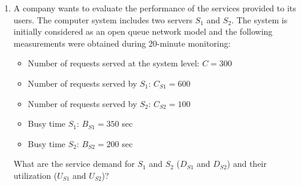 \begin{enumerate}
    
    \newpage


    \item A company wants to evaluate the performance of the services provided to its users. The computer system includes two servers $S_1$ and $S_2$. The system is initially considered as an open queue network model and the following measurements were obtained during 20-minute monitoring:
    \begin{itemize}
        \item Number of requests served at the system level: $C = 300$
        \item Number of requests served by $S_1$: $C_{S1} = 600$
        \item Number of requests served by $S_2$: $C_{S2} = 100$
        \item Busy time $S_1$: $B_{S1} = 350$ sec
        \item Busy time $S_2$: $B_{S2} = 200$ sec
    \end{itemize}
    What are the service demand for $S_{1}$ and $S_{2}$ ($D_{S1}$ and $D_{S2}$) and their utilization ($U_{S1}$ and $U_{S2}$)?


\end{enumerate}
